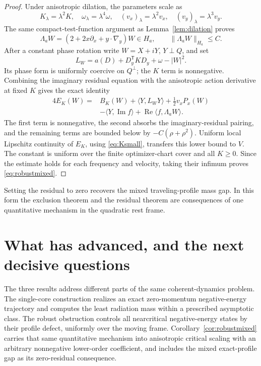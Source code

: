 \documentclass[11pt]{article}
\theoremstyle{definition}
\theoremstyle{remark}
\DeclareMathOperator{\Rea}{Re}
\DeclareMathOperator{\Ima}{Im}
\newcommand{\ip}[2]{\langle #1,#2\rangle}
\newcommand{\norm}[1]{\lVert #1\rVert}
\begin{document}
\begin{proof}
Under anisotropic dilation, the parameters scale as
\[
 K_\lambda=\lambda^2K,\quad\omega_\lambda=\lambda^4\omega,
 \quad(v_x)_\lambda=\lambda^2v_x,\quad(v_y)_\lambda=\lambda^3v_y.
\]
The same compact-test-function argument as Lemma~\ref{lem:dilation} proves
\[
 \Lambda_aW=(2+2x\partial_x+y\cdot\nabla_y)W\in H_a,
 \qquad\norm{\Lambda_aW}_{H_a}\le C.
\]
After a constant phase rotation write $W=X+iY$, $Y\perp Q$, and set
\[
 L_W=a(D)+D_y^{\mathsf T}KD_y+\omega-|W|^2.
\]
Its phase form is uniformly coercive on $Q^\perp$; the $K$ term is nonnegative. Combining the imaginary residual equation with the anisotropic action derivative at fixed $K$ gives the exact identity
\begin{align*}
 4E_K(W)={}&B_K(W)+\ip Y{L_WY}+\tfrac12v_xP_x(W)\\
 &-\ip Y{\Ima f}+\Rea\ip f{\Lambda_aW}.
\end{align*}
The first term is nonnegative, the second absorbs the imaginary-residual pairing, and the remaining terms are bounded below by $-C(\rho+\rho^2)$. Uniform local Lipschitz continuity of $E_K$, using \eqref{eq:Ksmall}, transfers this lower bound to $V$. The constant is uniform over the finite optimizer-chart cover and all $K\ge0$. Since the estimate holds for each frequency and velocity, taking their infimum proves \eqref{eq:robustmixed}.
\end{proof}

Setting the residual to zero recovers the mixed traveling-profile mass gap. In this form the exclusion theorem and the residual theorem are consequences of one quantitative mechanism in the quadratic rest frame.

\section{What has advanced, and the next decisive questions}

The three results address different parts of the same coherent-dynamics problem. The single-core construction realizes an exact zero-momentum negative-energy trajectory and computes the least radiation mass within a prescribed asymptotic class. The robust obstruction controls all nearcritical negative-energy states by their profile defect, uniformly over the moving frame. Corollary~\ref{cor:robustmixed} carries that same quantitative mechanism into anisotropic critical scaling with an arbitrary nonnegative lower-order coefficient, and includes the mixed exact-profile gap as its zero-residual consequence.
\end{document}
